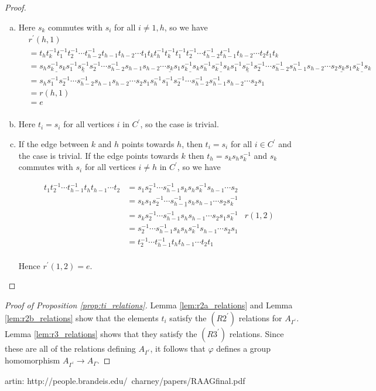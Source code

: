\documentclass[11pt]{amsart}
\theoremstyle{definition}
\begin{document}
\begin{proof}
\begin{enumerate}[a)]
\item Here $s_k$ commutes with $s_i$ for all $i\ne 1,h$, so we have
\begin{align*}
& r^\prime(h,1)\\
&= t_ht_k^{-1}t_1^{-1}t_2^{-1}\cdots t_{h-2}^{-1}t_{h-1}t_{h-2}\cdots t_1t_kt_h^{-1}t_k^{-1}t_1^{-1}t_2^{-1}\cdots t_{h-2}^{-1}t_{h-1}^{-1}t_{h-2}\cdots t_2t_1t_k\\
&= s_h\underline{s_k^{-1}s_k}s_1^{-1}\underline{s_k^{-1}}s_2^{-1}\cdots s_{h-2}^{-1}s_{h-1}s_{h-2}\cdots \underline{s_k}s_1\underline{s_k^{-1}s_k}s_h^{-1}\underline{s_k^{-1}s_k}s_1^{-1}\underline{s_k^{-1}}s_2^{-1}\cdots s_{h-2}^{-1}s_{h-1}^{-1}s_{h-2}\cdots s_2 \underline{s_k}s_1\underline{s_k^{-1}s_k}\\
&= s_hs_1^{-1}s_2^{-1}\cdots s_{h-2}^{-1}s_{h-1}s_{h-2}\cdots s_2s_1s_h^{-1}s_1^{-1}s_2^{-1}\cdots s_{h-2}^{-1}s_{h-1}^{-1}s_{h-2}\cdots s_2s_1\\
&= r(h,1)\\
&= e\\
\end{align*}

\item Here $t_i = s_i$ for all vertices $i$ in $C^\prime$, so the case is trivial.

\item  If the edge between $k$ and $h$ points towards $h$, then $t_i = s_i$ for all $i\in C^\prime$ and the case is trivial.  If the edge points towards $k$ then $t_h = s_ks_hs_k^{-1}$ and $s_k$ commutes with $s_i$ for all vertices $i\ne h$ in $C^\prime$, so we have

\begin{align*}
t_1t_2^{-1}\cdots t_{h-1}^{-1}t_ht_{h-1}\cdots t_2 &= s_1s_2^{-1}\cdots s_{h-1}^{-1}s_ks_hs_k^{-1}s_{h-1}\cdots s_2\\
&= s_k\underline{s_1s_2^{-1}\cdots s_{h-1}^{-1}s_hs_{h-1}\cdots s_2}s_k^{-1}\\
&= s_ks_2^{-1}\cdots s_{h-1}^{-1}s_hs_{h-1}\cdots s_2s_1s_k^{-1} &r(1,2)\\
&= s_2^{-1}\cdots s_{h-1}^{-1}s_ks_hs_k^{-1}s_{h-1}\cdots s_2s_1\\
&= t_2^{-1}\cdots t_{h-1}^{-1}t_ht_{h-1}\cdots t_2t_1\\
\end{align*}

\noindent Hence $r^\prime(1,2) = e$.
\end{enumerate}
\end{proof}


\begin{proof}[Proof of Proposition \ref{prop:ti_relations}]
Lemma \ref{lem:r2a_relations} and Lemma \ref{lem:r2b_relations} show that the elements $t_i$ satisfy the $(R2^\prime)$ relations for $A_{\Gamma^\prime}$. Lemma \ref{lem:r3_relations} shows that they satisfy the $(R3^\prime)$ relations. Since these are all of the relations defining $A_{\Gamma^\prime}$, it follows that $\varphi$ defines a group homomorphism $A_{\Gamma^\prime}\rightarrow A_\Gamma$.
\end{proof}





artin: http://people.brandeis.edu/~charney/papers/RAAGfinal.pdf
\end{document}
